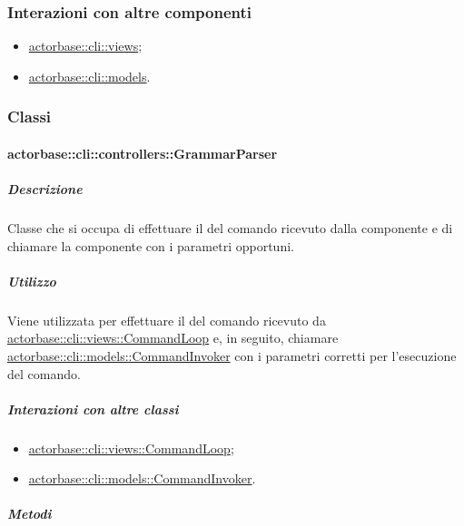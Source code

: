\documentclass{scalatekids-article}
\begin{document}
\subsubsection{Interazioni con altre componenti}

\begin{itemize}
\item \hyperref[sec:actorbase::cli::views]{actorbase::cli::views};
\item \hyperref[sec:actorbase::cli::models]{actorbase::cli::models}.
\end{itemize}

\subsubsection{Classi}

\paragraph{actorbase::cli::controllers::GrammarParser}
\label{sec:actorbase::cli::controllers::GrammarParser}

\subparagraph{Descrizione}

Classe che si occupa di effettuare il  del comando ricevuto
dalla componente  e di chiamare la componente  con i
parametri opportuni.

\subparagraph{Utilizzo}

Viene utilizzata per effettuare il  del comando ricevuto da
\hyperref[sec:actorbase::cli::views::CommandLoop]{actorbase::cli::views::CommandLoop} e, in seguito, chiamare
\hyperref[sec:actorbase::cli::models::CommandInvoker]{actorbase::cli::models::CommandInvoker} con i parametri corretti per
l'esecuzione del comando.

\subparagraph{Interazioni con altre classi}

\begin{itemize}
\item \hyperref[sec:actorbase::cli::views::CommandLoop]{actorbase::cli::views::CommandLoop};
\item \hyperref[sec:actorbase::cli::models::CommandInvoker]{actorbase::cli::models::CommandInvoker}.
\end{itemize}

\subparagraph{Metodi}
\end{document}
